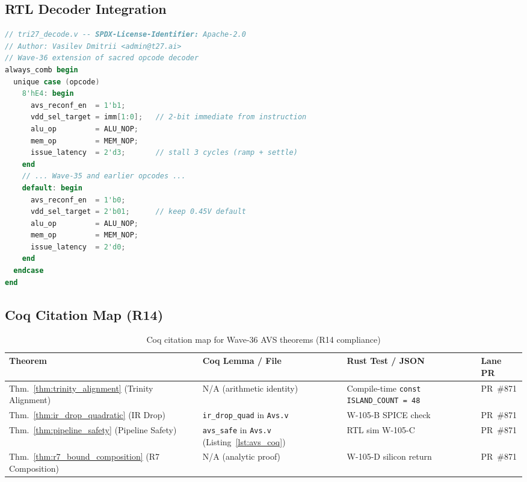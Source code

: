 \subsection{RTL Decoder Integration}

\begin{lstlisting}[language=verilog, caption={RTL decoder snippet for OP\_AVS\_RECONF (0xE4)}]
// tri27_decode.v -- SPDX-License-Identifier: Apache-2.0
// Author: Vasilev Dmitrii <admin@t27.ai>
// Wave-36 extension of sacred opcode decoder
always_comb begin
  unique case (opcode)
    8'hE4: begin
      avs_reconf_en  = 1'b1;
      vdd_sel_target = imm[1:0];   // 2-bit immediate from instruction
      alu_op         = ALU_NOP;
      mem_op         = MEM_NOP;
      issue_latency  = 2'd3;       // stall 3 cycles (ramp + settle)
    end
    // ... Wave-35 and earlier opcodes ...
    default: begin
      avs_reconf_en  = 1'b0;
      vdd_sel_target = 2'b01;      // keep 0.45V default
      alu_op         = ALU_NOP;
      mem_op         = MEM_NOP;
      issue_latency  = 2'd0;
    end
  endcase
end
\end{lstlisting}

\subsection{Coq Citation Map (R14)}

\begin{table}[ht]
\centering
\caption{Coq citation map for Wave-36 AVS theorems (R14 compliance)}
\label{tab:coq_citation_map}
\begin{tabular}{p{3.5cm}p{3.5cm}p{3cm}p{2cm}}
\hline
Theorem & Coq Lemma / File & Rust Test / JSON & Lane PR \\
\hline
Thm.~\ref{thm:trinity_alignment} (Trinity Alignment) &
  N/A (arithmetic identity) &
  Compile-time \texttt{const ISLAND\_COUNT = 48} &
  PR~\#871 \\
Thm.~\ref{thm:ir_drop_quadratic} (IR Drop) &
  \texttt{ir\_drop\_quad} in \newline \texttt{Avs.v} &
  W-105-B SPICE check &
  PR~\#871 \\
Thm.~\ref{thm:pipeline_safety} (Pipeline Safety) &
  \texttt{avs\_safe} in \newline \texttt{Avs.v} (Listing~\ref{lst:avs_coq}) &
  RTL sim W-105-C &
  PR~\#871 \\
Thm.~\ref{thm:r7_bound_composition} (R7 Composition) &
  N/A (analytic proof) &
  W-105-D silicon return &
  PR~\#871 \\
\hline
\end{tabular}
\end{table}

